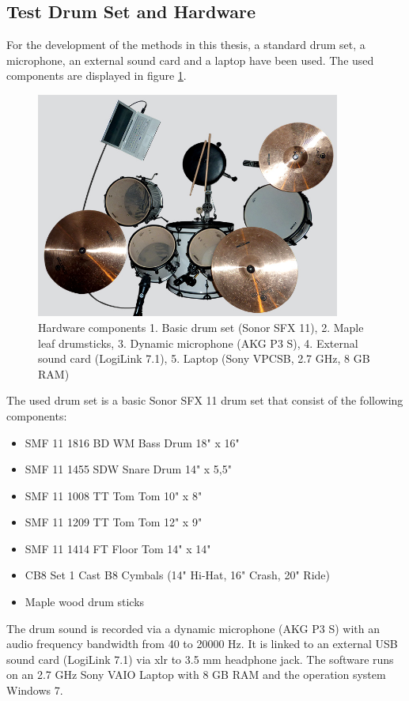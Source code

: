 \subsection{Test Drum Set and Hardware} \label{section:hardware}

For the development of the methods in this thesis, a standard drum set, a microphone, an external sound card and a laptop have been used. The used components are displayed in figure \ref{fig:components}.

\begin{figure}
	\includegraphics[width=10cm]{images/drumset/drumset_01.jpg}
	\caption{Hardware components 1. Basic drum set (Sonor SFX 11), 2. Maple leaf drumsticks, 3. Dynamic microphone (AKG P3 S), 4. External sound card (LogiLink 7.1), 5. Laptop (Sony VPCSB, 2.7 GHz, 8 GB RAM)}
	\label{fig:components} 
\end{figure}

The used drum set is a basic Sonor SFX 11 drum set that consist of the following components:

\begin{itemize} 
	\item SMF 11 1816 BD WM Bass Drum 18" x 16"
	\item SMF 11 1455 SDW Snare Drum 14" x 5,5"
	\item SMF 11 1008 TT Tom Tom 10" x 8"
	\item SMF 11 1209 TT Tom Tom 12" x 9"
	\item SMF 11 1414 FT Floor Tom 14" x 14"
	\item CB8 Set 1 Cast B8 Cymbals (14" Hi-Hat, 16" Crash, 20" Ride)
	\item Maple wood drum sticks
\end{itemize}

The drum sound is recorded via a dynamic microphone (AKG P3 S) with an audio frequency bandwidth from	40 to 20000 Hz. It is linked to an external USB sound card (LogiLink 7.1) via xlr to 3.5 mm headphone jack. The software runs on an 2.7 GHz Sony VAIO Laptop with 8 GB RAM and the operation system Windows 7.
